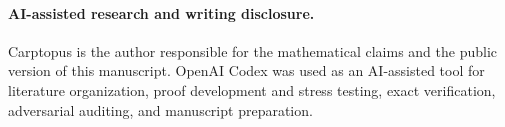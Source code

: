 \documentclass[11pt]{article}
\numberwithin{equation}{section}
\begin{document}
\paragraph{AI-assisted research and writing disclosure.}
Carptopus is the author responsible for the mathematical claims and the public version of this
manuscript. OpenAI Codex was used as an AI-assisted tool for literature organization, proof
development and stress testing, exact verification, adversarial auditing, and manuscript
preparation.
\end{document}
